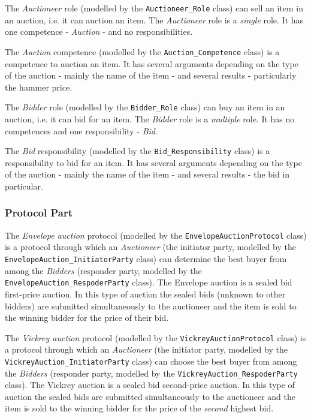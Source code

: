 The \textit{Auctioneer} role (modelled by the \texttt{Auctioneer\_Role} class) can sell an item in an auction, i.e. it can auction an item.
The \textit{Auctioneer} role is a \textit{single} role.
It has one competence - \textit{Auction} - and no responsibilities.

The \textit{Auction} competence (modelled by the \texttt{Auction\_Competence} class) is a competence to auction an item.
It has several arguments depending on the type of the auction - mainly the name of the item - and several results - particularly the hammer price.

The \textit{Bidder} role (modelled by the \texttt{Bidder\_Role} class) can buy an item in an auction, i.e. it can bid for an item. 
The \textit{Bidder} role is a \textit{multiple} role.
It has no competences and one responsibility - \textit{Bid}.

The \textit{Bid} responsibility (modelled by the \texttt{Bid\_Responsibility} class) is a responsibility to bid for an item.
It has several arguments depending on the type of the auction - mainly the name of the item - and several results - the bid in particular.

\subsubsection*{Protocol Part}

The \textit{Envelope auction} protocol (modelled by the \texttt{EnvelopeAuctionProtocol} class) is a protocol through which an \textit{Auctioneer} (the initiator party, modelled by the \texttt{EnvelopeAuction\_InitiatorParty} class) can determine the best buyer from among the \textit{Bidders} (responder party, modelled by the \texttt{EnvelopeAuction\_RespoderParty} class).
The Envelope auction is a sealed bid first-price auction.
In this type of auction the sealed bids (unknown to other bidders) are submitted simultaneously to the auctioneer and the item is sold to the winning bidder for the price of their bid.

The \textit{Vickrey auction} protocol (modelled by the \texttt{VickreyAuctionProtocol} class) is a protocol through which an \textit{Auctioneer} (the initiator party, modelled by the \texttt{VickreyAuction\_InitiatorParty} class) can choose the best buyer from among the \textit{Bidders} (responder party, modelled by the \texttt{VickreyAuction\_RespoderParty} class).
The Vickrey auction is a sealed bid second-price auction.
In this type of auction the sealed bids are submitted simultaneously to the auctioneer and the item is sold to the winning bidder for the price of the \textit{second} highest bid.

